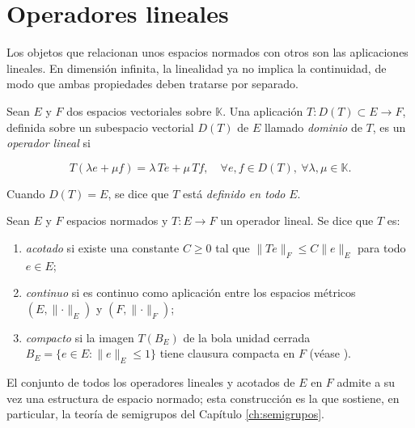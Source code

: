 \section{Operadores lineales}
\label{ch:preliminares:section:operadores}

Los objetos que relacionan unos espacios normados con otros son las aplicaciones
lineales. En dimensión infinita, la linealidad ya no implica la continuidad, de
modo que ambas propiedades deben tratarse por separado.\\

\begin{Definicion}
\label{ch:preliminares:def:operadorLineal}

Sean $E$ y $F$ dos espacios vectoriales sobre $\mathbb{K}$. Una aplicación
$T : D(T) \subset E \rightarrow F$, definida sobre un subespacio vectorial $D(T)$
de $E$ llamado \textit{dominio} de $T$, es un \textit{operador lineal} si

\[T(\lambda e + \mu f) = \lambda \, Te + \mu \, Tf, \quad \forall e, f \in D(T), \ \forall \lambda, \mu \in \mathbb{K}.\]

Cuando $D(T) = E$, se dice que $T$ está \textit{definido en todo} $E$.
\end{Definicion}

\begin{Definicion}
\label{ch:preliminares:def:operadorAcotado}

Sean $E$ y $F$ espacios normados y $T : E \rightarrow F$ un operador lineal. Se
dice que $T$ es:

\begin{enumerate}
    \item \textit{acotado} si existe una constante $C \geq 0$ tal que
    $\lVert Te \rVert_F \leq C \lVert e \rVert_E$ para todo $e \in E$;

    \item \textit{continuo} si es continuo como aplicación entre los espacios
    métricos $(E, \lVert \cdot \rVert_E)$ y $(F, \lVert \cdot \rVert_F)$;

    \item \textit{compacto} si la imagen $T(B_E)$ de la bola unidad cerrada
    $B_E = \{e \in E : \lVert e \rVert_E \leq 1\}$ tiene clausura compacta en $F$
    (véase \cite[Cap.~6]{brezis-2011-fun-ana-sob}).
\end{enumerate}
\end{Definicion}

El conjunto de todos los operadores lineales y acotados de $E$ en $F$ admite a su
vez una estructura de espacio normado; esta construcción es la que sostiene, en
particular, la teoría de semigrupos del Capítulo \ref{ch:semigrupos}.\\

